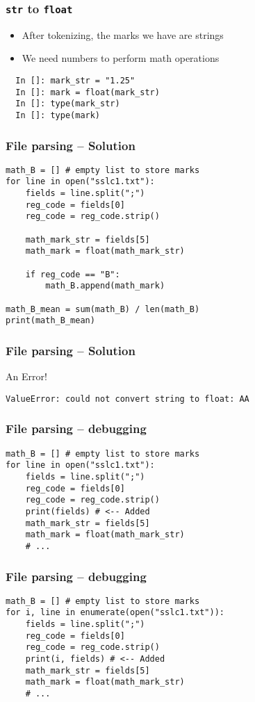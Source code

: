 \documentclass[14pt,compress]{beamer}
\begin{document}
\begin{frame}[fragile]
  \frametitle{\texttt{str} to \texttt{float}}
  \begin{itemize}
  \item After tokenizing, the marks we have are strings
  \item We need numbers to perform math operations
  \end{itemize}
  \begin{lstlisting}
  In []: mark_str = "1.25"
  In []: mark = float(mark_str)
  In []: type(mark_str)
  In []: type(mark)
  \end{lstlisting}
\end{frame}

\begin{frame}
  \frametitle{File parsing -- Solution}
  \begin{lstlisting}
math_B = [] # empty list to store marks
for line in open("sslc1.txt"):
    fields = line.split(";")
    reg_code = fields[0]
    reg_code = reg_code.strip()

    math_mark_str = fields[5]
    math_mark = float(math_mark_str)

    if reg_code == "B":
        math_B.append(math_mark)

math_B_mean = sum(math_B) / len(math_B)
print(math_B_mean)
  \end{lstlisting}
\end{frame}

\begin{frame}
  \frametitle{File parsing -- Solution}
  An Error!
  \small
  \begin{lstlisting}
ValueError: could not convert string to float: AA
  \end{lstlisting}
\end{frame}

\begin{frame}
  \frametitle{File parsing -- debugging}
  \begin{lstlisting}
math_B = [] # empty list to store marks
for line in open("sslc1.txt"):
    fields = line.split(";")
    reg_code = fields[0]
    reg_code = reg_code.strip()
    print(fields) # <-- Added
    math_mark_str = fields[5]
    math_mark = float(math_mark_str)
    # ...
  \end{lstlisting}
\end{frame}


\begin{frame}
  \frametitle{File parsing -- debugging}
  \small
  \begin{lstlisting}
math_B = [] # empty list to store marks
for i, line in enumerate(open("sslc1.txt")):
    fields = line.split(";")
    reg_code = fields[0]
    reg_code = reg_code.strip()
    print(i, fields) # <-- Added
    math_mark_str = fields[5]
    math_mark = float(math_mark_str)
    # ...
  \end{lstlisting}
\end{frame}
\end{document}

